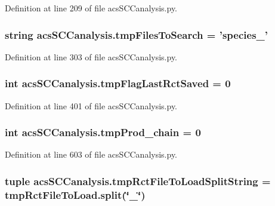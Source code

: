 Definition at line 209 of file acs\-S\-C\-Canalysis.\-py.

\hypertarget{a00096_a141356fc914110fdf3ec4f0fc3beaab5}{
\subsubsection[{tmp\-Files\-To\-Search}]{\setlength{\rightskip}{0pt plus 5cm}string acs\-S\-C\-Canalysis.\-tmp\-Files\-To\-Search = 'species\-\_\-'}}\label{a00096_a141356fc914110fdf3ec4f0fc3beaab5}


Definition at line 303 of file acs\-S\-C\-Canalysis.\-py.

\hypertarget{a00096_a6e8aff976901d1424dd1ff00c3387014}{
\subsubsection[{tmp\-Flag\-Last\-Rct\-Saved}]{\setlength{\rightskip}{0pt plus 5cm}int acs\-S\-C\-Canalysis.\-tmp\-Flag\-Last\-Rct\-Saved = 0}}\label{a00096_a6e8aff976901d1424dd1ff00c3387014}


Definition at line 401 of file acs\-S\-C\-Canalysis.\-py.

\hypertarget{a00096_aee6b4f50387d471b70458cf703c0863b}{
\subsubsection[{tmp\-Prod\-\_\-chain}]{\setlength{\rightskip}{0pt plus 5cm}int acs\-S\-C\-Canalysis.\-tmp\-Prod\-\_\-chain = 0}}\label{a00096_aee6b4f50387d471b70458cf703c0863b}


Definition at line 603 of file acs\-S\-C\-Canalysis.\-py.

\hypertarget{a00096_add910e17b3f1fe61cdbaf8ce60ec0e20}{
\subsubsection[{tmp\-Rct\-File\-To\-Load\-Split\-String}]{\setlength{\rightskip}{0pt plus 5cm}tuple acs\-S\-C\-Canalysis.\-tmp\-Rct\-File\-To\-Load\-Split\-String = {\bf tmp\-Rct\-File\-To\-Load.\-split}(\char`\"{}\-\_\-\char`\"{})}}\label{a00096_add910e17b3f1fe61cdbaf8ce60ec0e20}


